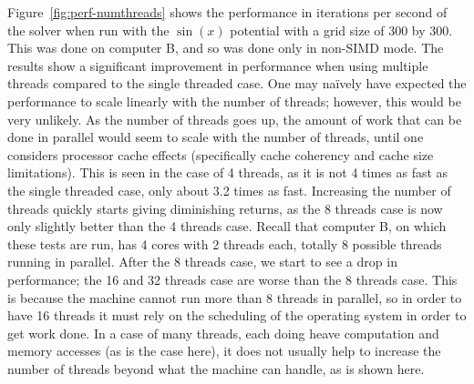 













Figure~\ref{fig:perf-numthreads} shows the performance in iterations per second of the solver when run
with the $\sin(x)$ potential with a grid size of 300 by 300. This was done on computer B, and so was done
only in non-SIMD mode. The results show a significant improvement in performance when using multiple threads
compared to the single threaded case. One may na\"{i}vely have expected the performance to scale linearly
with the number of threads; however, this would be very unlikely. As the number of threads goes up, the amount
of work that can be done in parallel would seem to scale with the number of threads, until one considers processor cache effects (specifically
cache coherency and cache size limitations). This is seen in the case of 4 threads, as it is not 4 times as fast as
the single threaded case, only about 3.2 times as fast. Increasing the number of threads quickly starts giving diminishing
returns, as the 8 threads case is now only slightly better than the 4 threads case. Recall that computer B, on which these
tests are run, has 4 cores with 2 threads each, totally 8 possible threads running in parallel. After the 8 threads case,
we start to see a drop in performance; the 16 and 32 threads case are worse than the 8 threads case. This is because
the machine cannot run more than 8 threads in parallel, so in order to have 16 threads it must rely on the scheduling
of the operating system in order to get work done. In a case of many threads, each doing heave computation and memory accesses
(as is the case here), it does not usually help to increase the number of threads beyond what the machine can handle,
as is shown here.

